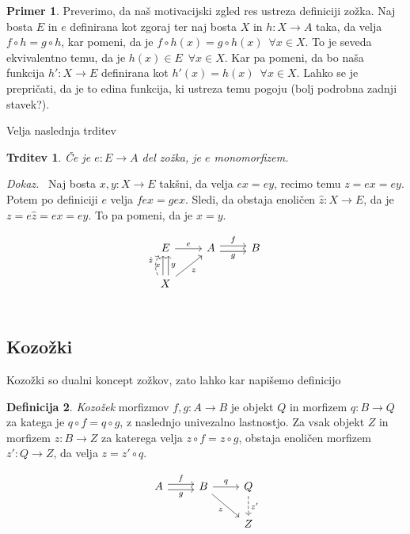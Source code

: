 \documentclass[12pt,a4paper]{book}
\theoremstyle{definition}
\newtheorem{definicija}{Definicija}[chapter]
\theoremstyle{plain}
\newtheorem{trditev}[definicija]{Trditev}
\newenvironment{dokaz}{\emph{Dokaz.}\ }{\hspace{\fill}{$\Box$}}
\theoremstyle{definition}
\newtheorem{primer}{Primer}[section]
\theoremstyle{remark}
\begin{document}
\begin{primer}
Preverimo, da naš motivacijski zgled res ustreza definiciji zožka. Naj bosta $E$ in $e$ definirana kot zgoraj ter naj bosta $X$ in $h:X \to A$ taka, da velja $f \circ h = g \circ h$, kar pomeni, da je $f \circ h(x) = g \circ  h(x) \enspace \forall x \in X$. To je seveda ekvivalentno temu, da je $h(x) \in E \enspace \forall x \in X$. Kar pa pomeni, da bo naša funkcija $h' : X \to E$ definirana kot $h'(x) = h(x) \enspace \forall x \in X$. Lahko se je prepričati, da je to edina funkcija, ki ustreza temu pogoju (bolj podrobna zadnji stavek?).
\end{primer}

Velja naslednja trditev

\begin{trditev}
Če je $e : E \to A$ del zožka, je $e$ monomorfizem.
\end{trditev}
\begin{dokaz}
Naj bosta $x,y : X \to E$ takšni, da velja $ex = ey$, recimo temu $z = ex = ey$. Potem po definiciji $e$ velja $fex = gex$. Sledi, da obstaja enoličen $\hat{z} : X \to E$, da je $z = e\hat{z} = ex = ey$. To pa pomeni, da je $x = y$.

$$\begin{tikzcd}
E \ar[r, "e"] & A \ar[r, shift left, "f"] \ar[r, shift right, "g"'] & B \\
X \ar[u, bend left, shift left, dashed, "\hat{z}"] \ar[u, shift left, "x"] \ar[u, shift right, "y"'] \ar[ur, "z"'] \\
\end{tikzcd}$$

\end{dokaz}


\subsection{Kozožki}

Kozožki so dualni koncept zožkov, zato lahko kar napišemo definicijo

\begin{definicija}
\textit{Kozožek} morfizmov $f,g:A \to B$ je objekt $Q$ in morfizem $q: B \to Q$ za katega je $q \circ f = q \circ g$, z naslednjo univezalno lastnostjo. Za vsak objekt $Z$ in morfizem $z : B \to Z$ za katerega velja $z \circ f = z \circ g$, obstaja enoličen morfizem $z' : Q \to Z$, da velja $z = z' \circ q$.

$$\begin{tikzcd}
A \ar[r, shift left, "f"] \ar[r, shift right, "g"'] & B \ar[r, "q"] \ar[dr, "z"'] & Q \ar[d, dashed, "z'"] \\
& & Z \\
\end{tikzcd}$$

\end{definicija}
\end{document}
